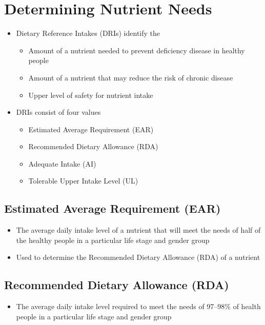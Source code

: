 \documentclass[title={Chapter 1}]{fdsn201notes}
\begin{document}
\section{Determining Nutrient Needs}\label{sec:determining-nutrient-needs}
\begin{itemize}
	\item Dietary Reference Intakes (DRIs) identify the
	\begin{itemize}
		\item Amount of a nutrient needed to prevent deficiency disease in healthy people
		\item Amount of a nutrient that may reduce the risk of chronic disease
		\item Upper level of safety for nutrient intake
	\end{itemize}
	\item DRIs consist of four values
	\begin{itemize}
		\item Estimated Average Requirement (EAR)
		\item Recommended Dietary Allowance (RDA)
		\item Adequate Intake (AI)
		\item Tolerable Upper Intake Level (UL)
	\end{itemize}
\end{itemize}

\subsection{Estimated Average Requirement (EAR)}\label{subsec:estimated-average-requirement-(ear)}
\begin{itemize}
	\item The average daily intake level of a nutrient that will meet the needs of half of the healthy people in a particular life stage and gender group
	\item Used to determine the Recommended Dietary Allowance (RDA) of a nutrient
\end{itemize}

\subsection{Recommended Dietary Allowance (RDA)}\label{subsec:recommended-dietary-allowance-(rda)}
\begin{itemize}
	\item The average daily intake level required to meet the needs of 97--98\% of health people in a particular life stage and gender group
\end{itemize}
\end{document}
